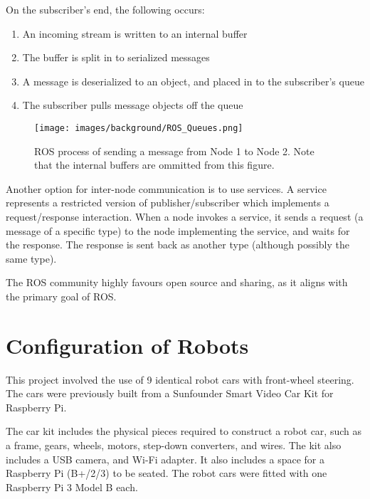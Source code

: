 \documentclass[../dissertation.tex]{subfiles}
\begin{document}
On the subscriber's end, the following occurs:

\begin{enumerate}
  \item An incoming stream is written to an internal buffer
  \item The buffer is split in to serialized messages
  \item A message is deserialized to an object, and placed in to the subscriber's queue
  \item The subscriber pulls message objects off the queue
\end{enumerate}

\begin{figure}[H]
\centering
\texttt{[image: images/background/ROS\_Queues.png]}
\caption{ROS process of sending a message from Node 1 to Node 2. Note that the internal buffers are ommitted from this figure.}
\end{figure}

Another option for inter-node communication is to use services. A service represents a restricted version of publisher/subscriber which implements a request/response interaction. When a node invokes a service, it sends a request (a message of a specific type) to the node implementing the service, and waits for the response. The response is sent back as another type (although possibly the same type).

The ROS community highly favours open source and sharing, as it aligns with the primary goal of ROS.

\section{Configuration of Robots}
\label{background-robot-config}

This project involved the use of 9 identical robot cars with front-wheel steering. The cars were previously built from a Sunfounder Smart Video Car Kit for Raspberry Pi\cite{SunfounderRobotCarKit}.

The car kit includes the physical pieces required to construct a robot car, such as a frame, gears, wheels, motors, step-down converters, and wires. The kit also includes a USB camera, and Wi-Fi adapter. It also includes a space for a Raspberry Pi (B+/2/3) to be seated. The robot cars were fitted with one Raspberry Pi 3 Model B each.
\end{document}
